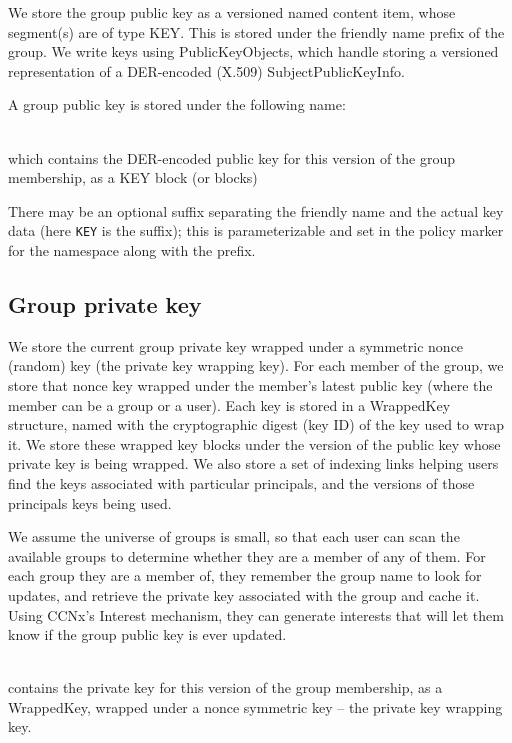 We store the group public key as a versioned named content item, whose
segment(s) are of type KEY. This is stored under the friendly name
prefix of the group. We write keys using PublicKeyObjects, which
handle storing a versioned representation of a DER-encoded (X.509)
SubjectPublicKeyInfo.

A group public key is stored under the following name:

\\

which contains the DER-encoded public key for this version of the
group membership, as a KEY block (or blocks)

There may be an optional suffix separating the friendly name and the actual
key data (here {\tt KEY} is the suffix); this is parameterizable and set in the
policy marker for the namespace along with the prefix.

\subsection{Group private key}

We store the current group private key wrapped under a symmetric nonce
(random) key (the private key wrapping key). For each member of the
group, we store that nonce key wrapped under the member's latest
public key (where the member can be a group or a user). Each key is
stored in a WrappedKey structure, named with the cryptographic digest
(key ID) of the key used to wrap it. We store these wrapped key blocks
under the version of the public key whose private key is being
wrapped. We also store a set of indexing links helping users find the
keys associated with particular principals, and the versions of those
principals keys being used.

We assume the universe of groups is small, so that each user can scan
the available groups to determine whether they are a member of any of
them. For each group they are a member of, they remember the group
name to look for updates, and retrieve the private key associated with
the group and cache it. Using CCNx's Interest mechanism, they can
generate interests that will let them know if the group public key is
ever updated.

\\
contains the private key for this version of the group membership, as
a WrappedKey, wrapped under a nonce symmetric key -- the private key
wrapping key.

